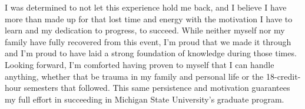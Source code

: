 \documentclass[11pt]{article}
\newcommand{\school}{Michigan State University}
\begin{document}
I was determined to not let this experience hold me back, and I believe I have more than made up for that lost time and energy with the motivation I have to learn and my dedication to progress, to succeed. While neither myself nor my family have fully recovered from this event, I'm proud that we made it through and I'm proud to have laid a strong foundation of knowledge during those times. Looking forward, I'm comforted having proven to myself that I can handle anything, whether that be trauma in my family and personal life or the 18-credit-hour semesters that followed. This same persistence and motivation guarantees my full effort in succeeding in \school{}'s graduate program.
\end{document}
